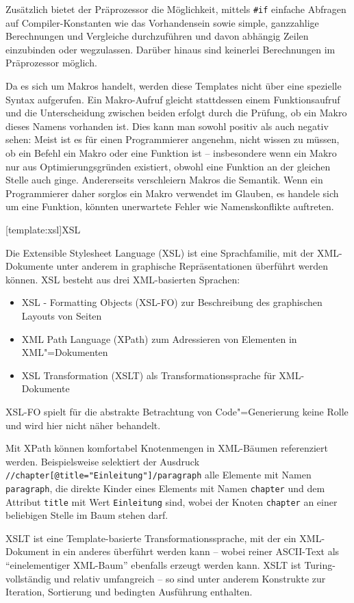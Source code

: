 \documentclass[12pt, a4paper, bibgerm]{scrbook}
\newcommand\icode[1]{\lstinline?#1?}
\newcommand\lsection{}
\newcommand{\cgen}{Code"=Generierung}
\begin{document}
Zusätzlich bietet der Präprozessor die Möglichkeit, mittels \icode{#if}
einfache Abfragen auf Compiler-Konstanten wie das Vorhandensein sowie
simple, ganzzahlige Berechnungen und Vergleiche durchzuführen und davon
abhängig Zeilen einzubinden oder wegzulassen. Darüber hinaus sind
keinerlei Berechnungen im Präprozessor möglich.

Da es sich um Makros handelt, werden diese Templates nicht über eine
spezielle Syntax aufgerufen. Ein Makro-Aufruf gleicht stattdessen einem
Funktionsaufruf und die Unterscheidung zwischen beiden erfolgt durch die
Prüfung, ob ein Makro dieses Namens vorhanden ist. Dies kann man sowohl
positiv als auch negativ sehen: Meist ist es für einen Programmierer
angenehm, nicht wissen zu müssen, ob ein Befehl ein Makro oder eine
Funktion ist -- insbesondere wenn ein Makro nur aus Optimierungsgründen
existiert, obwohl eine Funktion an der gleichen Stelle auch
ginge. Andererseits verschleiern Makros die Semantik. Wenn ein
Programmierer daher sorglos ein Makro verwendet im Glauben, es handele
sich um eine Funktion, könnten unerwartete Fehler wie Namenskonflikte
auftreten.

\lsection[template:xsl]{XSL}

Die Extensible Stylesheet Language (XSL) \cite{XSLT} ist eine
Sprachfamilie, mit der XML-Dokumente unter anderem in graphische
Repräsentationen überführt werden können. XSL besteht aus drei
XML-basierten Sprachen:
\begin{itemize}
\item XSL - Formatting Objects (XSL-FO) zur Beschreibung des graphischen Layouts von Seiten
\item XML Path Language (XPath) zum Adressieren von Elementen in XML"=Dokumenten
\item XSL Transformation (XSLT) als Transformationssprache für XML-Dokumente
\end{itemize}
XSL-FO spielt für die abstrakte Betrachtung von \cgen{} keine Rolle und
wird hier nicht näher behandelt.

Mit XPath können komfortabel Knotenmengen in XML-Bäumen referenziert
werden. Beispielsweise selektiert der Ausdruck
\icode{//chapter[@title="Einleitung"]/paragraph} alle Elemente mit Namen
\icode{paragraph}, die direkte Kinder eines Elements mit Namen
\icode{chapter} und dem Attribut \icode{title} mit Wert
\icode{Einleitung} sind, wobei der Knoten \icode{chapter} an einer
beliebigen Stelle im Baum stehen darf.

XSLT ist eine Template-basierte Transformationssprache, mit der ein
XML-Dokument in ein anderes überführt werden kann -- wobei reiner
ASCII-Text als "`einelementiger XML-Baum"' ebenfalls erzeugt werden
kann. XSLT ist Turing-vollständig und relativ umfangreich -- so sind
unter anderem Konstrukte zur Iteration, Sortierung und bedingten
Ausführung enthalten. 
\end{document}
